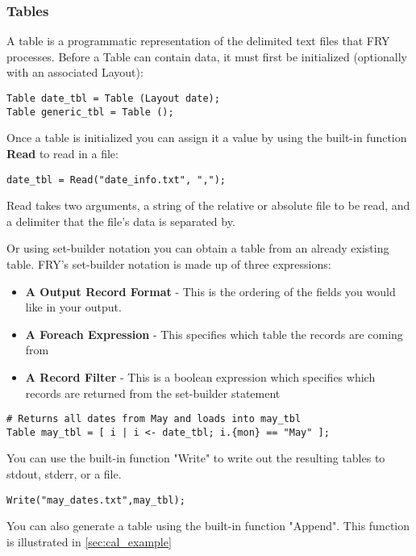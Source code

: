 \documentclass{article}
\begin{document}
\subsubsection{Tables}
\label{sec:Tables}
A table is a programmatic representation of the delimited text files that FRY processes. Before a Table can contain data, it must first be initialized (optionally with an associated Layout):

\begin{lstlisting}
Table date_tbl = Table (Layout date);
Table generic_tbl = Table ();
\end{lstlisting}

Once a table is initialized you can assign it a value by using the built-in function \textbf{Read} to read in a file:

\begin{lstlisting}
date_tbl = Read("date_info.txt", ",");
\end{lstlisting}

Read takes two arguments, a string of the relative or absolute file to be read, and a delimiter that the file's data is separated by.

Or using set-builder notation you can obtain a table from an already existing table. FRY's set-builder notation is made up of three expressions:
\begin{itemize}
\item \textbf{A Output Record Format} - This is the ordering of the fields you would like in your output.
\item \textbf{A Foreach Expression} - This specifies which table the records are coming from
\item \textbf{A Record Filter} - This is a boolean expression which specifies which records are returned from the set-builder statement
\end{itemize}

\begin{lstlisting}
# Returns all dates from May and loads into may_tbl
Table may_tbl = [ i | i <- date_tbl; i.{mon} == "May" ];
\end{lstlisting}
You can use the built-in function "Write" to write out the resulting tables to stdout, stderr, or a file.
\begin{lstlisting}
Write("may_dates.txt",may_tbl);
\end{lstlisting}

You can also generate a table using the built-in function "Append". This function is illustrated in \ref{sec:cal_example}
\end{document}
